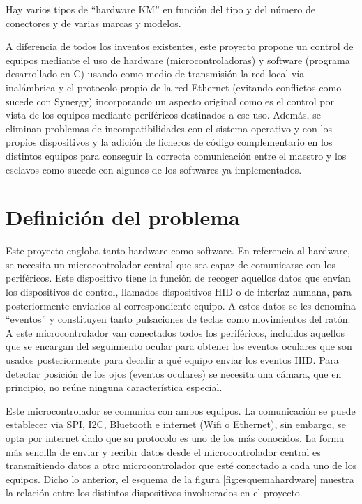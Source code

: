 Hay varios tipos de ``hardware KM'' en función del tipo y del número de conectores y de varias marcas y modelos.

A diferencia de todos los inventos existentes, este proyecto propone un control de equipos mediante el uso de hardware (microcontroladoras) y software (programa desarrollado en C) usando como medio de transmisión la red local vía inalámbrica y el protocolo propio de la red Ethernet (evitando conflictos como sucede con Synergy) incorporando un aspecto original como es el control por vista de los equipos mediante periféricos destinados a ese uso. Además, se eliminan problemas de incompatibilidades con el sistema operativo y con los propios dispositivos y la adición de ficheros de código complementario en los distintos equipos para conseguir la correcta comunicación entre el maestro y los esclavos como sucede con algunos de los softwares ya implementados.

\section{Definición del problema} \label{s1_3}

Este proyecto engloba tanto hardware como software. En referencia al hardware, se necesita un microcontrolador central que sea capaz de comunicarse con los periféricos. Este dispositivo tiene la función de recoger aquellos datos que envían los dispositivos de control, llamados dispositivos HID o de interfaz humana, para posteriormente enviarlos al correspondiente equipo. A estos datos se les denomina ``eventos'' y constituyen tanto pulsaciones de teclas como movimientos del ratón. A este microcontrolador van conectados todos los periféricos, incluidos aquellos que se encargan del seguimiento ocular para obtener los eventos oculares que son usados posteriormente para decidir a qué equipo enviar los eventos HID. Para detectar posición de los ojos (eventos oculares) se necesita una cámara, que en principio, no reúne ninguna característica especial.

Este microcontrolador se comunica con ambos equipos. La comunicación se puede establecer via SPI, I2C, Bluetooth e internet (Wifi o Ethernet), sin embargo, se opta por internet dado que su protocolo es uno de los más conocidos. La forma más sencilla de enviar y recibir datos desde el microcontrolador central es transmitiendo datos a otro microcontrolador que esté conectado a cada uno de los equipos. Dicho lo anterior, el esquema de la figura \ref{fig:esquemahardware} muestra la relación entre los distintos dispositivos involucrados en el proyecto.

